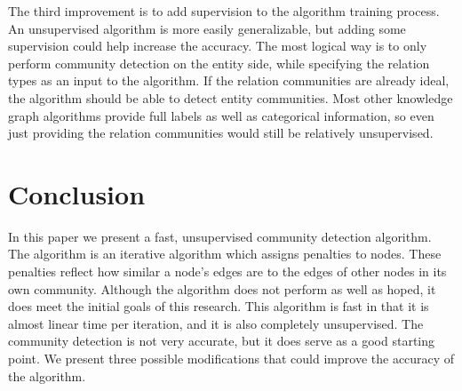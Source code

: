 \documentclass[12pt]{article}
\begin{document}
The third improvement is to add supervision to the algorithm training process.
An unsupervised algorithm is more easily generalizable, but adding some supervision
could help increase the accuracy. The most logical way is to only perform community
detection on the entity side, while specifying the relation types as an input
to the algorithm. If the relation communities are already ideal, the algorithm
should be able to detect entity communities. Most other knowledge graph algorithms
\cite{Nickel2011}\cite{Gao2015}\cite{Chang2014} provide full labels as well as
categorical information, so even just providing the relation communities would
still be relatively unsupervised.

\section{Conclusion}
\label{sec:Conclusion}

In this paper we present a fast, unsupervised community detection algorithm. The
algorithm is an iterative algorithm which assigns penalties to nodes. These
penalties reflect how similar a node's edges are to the edges of other nodes  in
its own community. Although the algorithm does not perform as well as hoped, it
does meet the initial goals of this research. This algorithm is fast in that it
is almost linear time per iteration, and it is also completely unsupervised. The
community detection is not very accurate, but it does serve as a good starting
point. We present three possible modifications that could improve the accuracy
of the algorithm.
\end{document}
